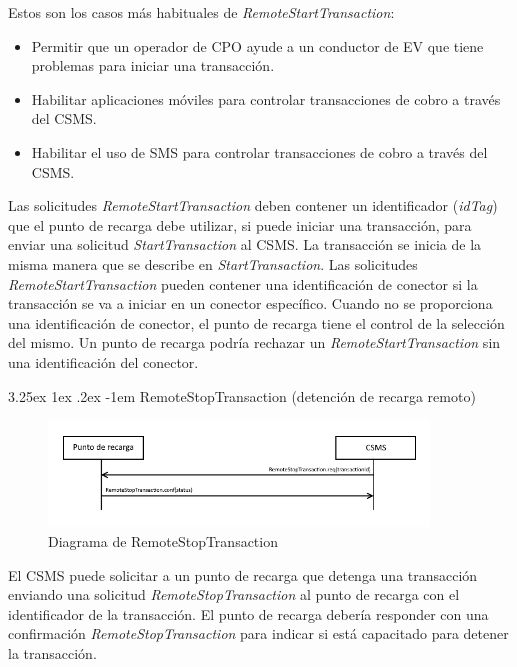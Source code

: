 \documentclass[12pt,a4paper,onecolumn,oneside]{report}
\makeatletter
\renewcommand\paragraph{\@startsection{paragraph}{5}{\z@}%
  {3.25ex \@plus1ex \@minus.2ex}%
  {-1em}%
  {\normalfont\normalsize\bfseries}}
\makeatother
\begin{document}
Estos son los casos más habituales de \textit{RemoteStartTransaction}:
\begin{itemize}
\item Permitir que un operador de CPO ayude a un conductor de EV que tiene problemas para iniciar una transacción.
\item Habilitar aplicaciones móviles para controlar transacciones de cobro a través del CSMS.
\item Habilitar el uso de SMS para controlar transacciones de cobro a través del CSMS.

\end{itemize}

Las solicitudes \textit{RemoteStartTransaction} deben contener un identificador (\textit{idTag}) que el punto de recarga debe utilizar, si puede iniciar una transacción, para enviar una solicitud \textit{StartTransaction} al CSMS. La transacción se inicia de la misma manera que se describe en \textit{StartTransaction}. Las solicitudes \textit{RemoteStartTransaction} pueden contener una identificación de conector si la transacción se va a iniciar en un conector específico. Cuando no se proporciona una identificación de conector, el punto de recarga tiene el control de la selección del mismo. Un punto de recarga podría rechazar un \textit{RemoteStartTransaction} sin una identificación del conector.


\paragraph{RemoteStopTransaction (detención de recarga remoto)}
\label{RemoteStopTransaction (detención de recarga remoto)}


\begin{figure}[H] 
\centering
  \includegraphics[width=0.9\textwidth]{figuras/diagramaremotestoptransaction.png}
  \caption[Diagrama de \textit{RemoteStopTransaction}]{Diagrama de RemoteStopTransaction\\
  }
  \label{fig:diagramaremotestoptransaction}
\end{figure}


El CSMS puede solicitar a un punto de recarga que detenga una transacción enviando una solicitud \textit{RemoteStopTransaction} al punto de recarga con el identificador de la transacción. El punto de recarga debería responder con una confirmación \textit{RemoteStopTransaction} para indicar si está capacitado para detener la transacción.
\end{document}
